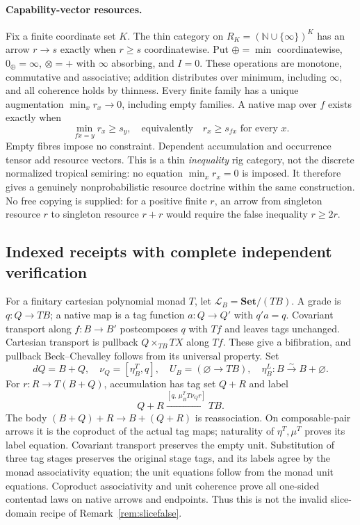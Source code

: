 \documentclass[11pt,a4paper]{article}
\theoremstyle{definition}
\newcommand{\Set}{\mathbf{Set}}
\newcommand{\Lcat}{\mathcal L}
\begin{document}
\paragraph{Capability-vector resources.}
Fix a finite coordinate set $K$. The thin category on
$R_K=(\mathbb N\cup\{\infty\})^K$ has an arrow $r\to s$ exactly when
$r\ge s$ coordinatewise. Put $\oplus=\min$ coordinatewise, $0_\oplus=\infty$,
$\otimes=+$ with $\infty$ absorbing, and $I=0$. These operations are monotone,
commutative and associative; addition distributes over minimum, including
$\infty$, and all coherence holds by thinness. Every finite family has a
unique augmentation $\min_xr_x\to0$, including empty families.
A native map over $f$ exists exactly when
\[
 \min_{fx=y}r_x\ge s_y,
 \quad\text{equivalently}\quad r_x\ge s_{fx}\text{ for every }x.
\]
Empty fibres impose no constraint. Dependent accumulation and occurrence
tensor add resource vectors. This is a thin \emph{inequality} rig category,
not the discrete normalized tropical semiring: no equation $\min_xr_x=0$ is
imposed. It therefore gives a genuinely nonprobabilistic resource doctrine
within the same construction. No free copying is supplied: for a positive
finite $r$, an arrow from singleton resource $r$ to singleton resource $r+r$
would require the false inequality $r\ge2r$.

\subsection{Indexed receipts with complete independent verification}
For a finitary cartesian polynomial monad $T$, let
$\Lcat_B=\Set/(TB)$. A grade is $q:Q\to TB$; a native map is a tag function
$a:Q\to Q'$ with $q'a=q$. Covariant transport along $f:B\to B'$ postcomposes
$q$ with $Tf$ and leaves tags unchanged. Cartesian transport is pullback
$Q\times_{TB}TX$ along $Tf$. These give a bifibration, and pullback
Beck--Chevalley follows from its universal property.
Set
\[
 dQ=B+Q,\quad \nu_Q=[\eta^T_B,q],\quad U_B=(\varnothing\to TB),
 \quad \eta^L_B:B\xrightarrow{\sim}B+\varnothing.
\]
For $r:R\to T(B+Q)$, accumulation has tag set $Q+R$ and label
\begin{equation}\label{eq:receiptmult}
 Q+R\xrightarrow{[q,\,\mu^T_B T\nu_Q r]}TB.
\end{equation}
The body $(B+Q)+R\to B+(Q+R)$ is reassociation. On composable-pair arrows it
is the coproduct of the actual tag maps; naturality of $\eta^T,\mu^T$ proves
its label equation. Covariant transport preserves the empty unit. Substitution
of three tag stages preserves the original stage tags, and its labels agree
by the monad associativity equation; the unit equations follow from the monad
unit equations. Coproduct associativity and unit coherence prove all one-sided
contentad laws on native arrows and endpoints. Thus this is not the invalid
slice-domain recipe of Remark~\ref{rem:slicefalse}.
\end{document}
